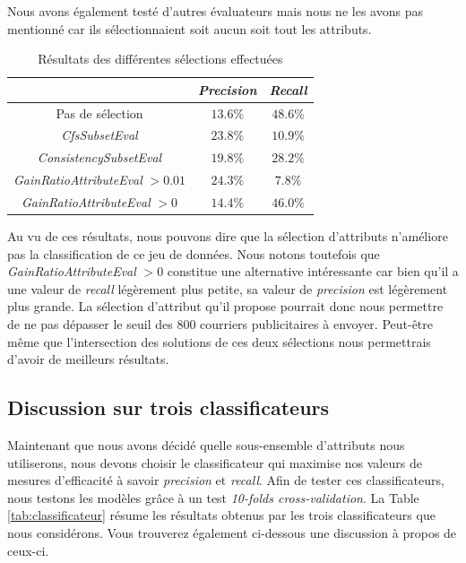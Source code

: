 \documentclass[10pt,a4paper]{article}
\begin{document}
				Nous avons également testé d'autres évaluateurs mais nous ne les avons pas mentionné car ils sélectionnaient soit aucun soit tout les attributs.
				
				\begin{table}[h]
					\centering
					\caption{Résultats des différentes sélections effectuées}
					\label{tab:select}
					\begin{tabular}{|c|c|c|}
						\hline
						& \textit{Precision} & \textit{Recall}\\
						\hline
						Pas de sélection & $13.6\%$& $48.6\%$\\
						\hline
						\textit{CfsSubsetEval} & $23.8\%$ & $10.9\%$ \\
						\hline
						\textit{ConsistencySubsetEval} & $19.8\%$ & $28.2\%$\\
						\hline
						\textit{GainRatioAttributeEval} $>0.01$ & $24.3\%$ & $7.8\%$ \\
						\hline
						\textit{GainRatioAttributeEval} $>0$ & $14.4\%$ & $46.0\%$ \\
						\hline
					\end{tabular}
				\end{table}
				
				Au vu de ces résultats, nous pouvons dire que la sélection d'attributs n'améliore pas la classification de ce jeu de données. Nous notons toutefois que \textit{GainRatioAttributeEval} $>0$ constitue une alternative intéressante car bien qu'il a une valeur de \textit{recall} légèrement plus petite, sa valeur de \textit{precision} est légèrement plus grande. La sélection d'attribut qu'il propose pourrait donc nous permettre de ne pas dépasser le seuil des 800 courriers publicitaires à envoyer. Peut-être même que l'intersection des solutions de ces deux sélections nous permettrais d'avoir de meilleurs résultats.
				
			\subsection{Discussion sur trois classificateurs}
			
				Maintenant que nous avons décidé quelle sous-ensemble d'attributs nous utiliserons, nous devons choisir le classificateur qui maximise nos valeurs de mesures d'efficacité à savoir \textit{precision} et \textit{recall}. Afin de tester ces classificateurs, nous testons les modèles grâce à un test \textit{10-folds cross-validation}. La Table \ref{tab:classificateur} résume les résultats obtenus par les trois classificateurs que nous considérons. Vous trouverez également ci-dessous une discussion à propos de ceux-ci.
				
\end{document}
